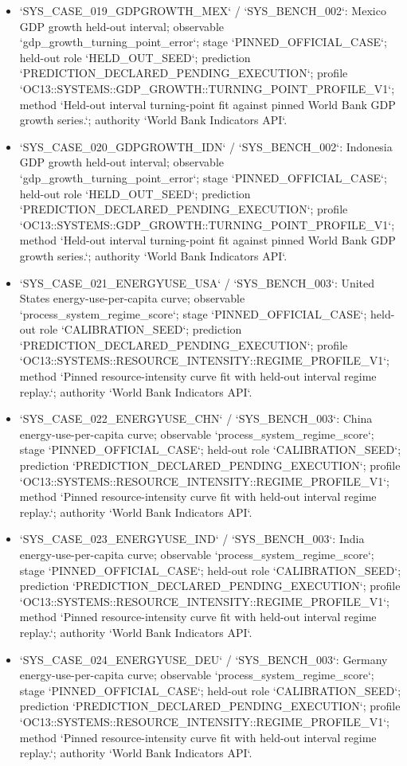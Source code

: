 \begin{itemize}
\item `SYS\_CASE\_019\_GDPGROWTH\_MEX` / `SYS\_BENCH\_002`: Mexico GDP growth held-out interval; observable `gdp\_growth\_turning\_point\_error`; stage `PINNED\_OFFICIAL\_CASE`; held-out role `HELD\_OUT\_SEED`; prediction `PREDICTION\_DECLARED\_PENDING\_EXECUTION`; profile `OC13::SYSTEMS::GDP\_GROWTH::TURNING\_POINT\_PROFILE\_V1`; method `Held-out interval turning-point fit against pinned World Bank GDP growth series.`; authority `World Bank Indicators API`.
\item `SYS\_CASE\_020\_GDPGROWTH\_IDN` / `SYS\_BENCH\_002`: Indonesia GDP growth held-out interval; observable `gdp\_growth\_turning\_point\_error`; stage `PINNED\_OFFICIAL\_CASE`; held-out role `HELD\_OUT\_SEED`; prediction `PREDICTION\_DECLARED\_PENDING\_EXECUTION`; profile `OC13::SYSTEMS::GDP\_GROWTH::TURNING\_POINT\_PROFILE\_V1`; method `Held-out interval turning-point fit against pinned World Bank GDP growth series.`; authority `World Bank Indicators API`.
\item `SYS\_CASE\_021\_ENERGYUSE\_USA` / `SYS\_BENCH\_003`: United States energy-use-per-capita curve; observable `process\_system\_regime\_score`; stage `PINNED\_OFFICIAL\_CASE`; held-out role `CALIBRATION\_SEED`; prediction `PREDICTION\_DECLARED\_PENDING\_EXECUTION`; profile `OC13::SYSTEMS::RESOURCE\_INTENSITY::REGIME\_PROFILE\_V1`; method `Pinned resource-intensity curve fit with held-out interval regime replay.`; authority `World Bank Indicators API`.
\item `SYS\_CASE\_022\_ENERGYUSE\_CHN` / `SYS\_BENCH\_003`: China energy-use-per-capita curve; observable `process\_system\_regime\_score`; stage `PINNED\_OFFICIAL\_CASE`; held-out role `CALIBRATION\_SEED`; prediction `PREDICTION\_DECLARED\_PENDING\_EXECUTION`; profile `OC13::SYSTEMS::RESOURCE\_INTENSITY::REGIME\_PROFILE\_V1`; method `Pinned resource-intensity curve fit with held-out interval regime replay.`; authority `World Bank Indicators API`.
\item `SYS\_CASE\_023\_ENERGYUSE\_IND` / `SYS\_BENCH\_003`: India energy-use-per-capita curve; observable `process\_system\_regime\_score`; stage `PINNED\_OFFICIAL\_CASE`; held-out role `CALIBRATION\_SEED`; prediction `PREDICTION\_DECLARED\_PENDING\_EXECUTION`; profile `OC13::SYSTEMS::RESOURCE\_INTENSITY::REGIME\_PROFILE\_V1`; method `Pinned resource-intensity curve fit with held-out interval regime replay.`; authority `World Bank Indicators API`.
\item `SYS\_CASE\_024\_ENERGYUSE\_DEU` / `SYS\_BENCH\_003`: Germany energy-use-per-capita curve; observable `process\_system\_regime\_score`; stage `PINNED\_OFFICIAL\_CASE`; held-out role `CALIBRATION\_SEED`; prediction `PREDICTION\_DECLARED\_PENDING\_EXECUTION`; profile `OC13::SYSTEMS::RESOURCE\_INTENSITY::REGIME\_PROFILE\_V1`; method `Pinned resource-intensity curve fit with held-out interval regime replay.`; authority `World Bank Indicators API`.

\end{itemize}
